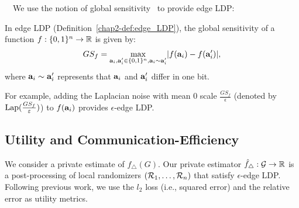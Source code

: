 \smallskip
{}~~We use the notion of global sensitivity~\cite{DP} to provide edge LDP: 
\begin{definition}
In edge LDP (Definition~\ref{chap2-def:edge_LDP}), the global sensitivity of a function $f: \{0,1\}^n \rightarrow \mathbb{R}$ is given by:
\begin{align*}
    GS_f = \underset{\mathbf{a}_i, \mathbf{a}'_i \in \{0,1\}^n, \mathbf{a}_i \sim \mathbf{a}'_i}{\max} |f(\mathbf{a}_i) - f(\mathbf{a}'_i)|,
\end{align*}
where $\mathbf{a}_i \sim \mathbf{a}'_i$ represents that $\mathbf{a}_i$ and $\mathbf{a}'_i$ differ in one bit.
\end{definition}
For example, adding the Laplacian noise with mean $0$ scale $\frac{GS_f}{\epsilon}$ (denoted by $\textrm{Lap}(\frac{GS_f}{\varepsilon})$) to 
$f(\mathbf{a}_i)$ 
provides $\epsilon$-edge LDP. 

\subsection{Utility and Communication-Efficiency}
\label{chap2-sub:utility_communication_efficiency}
We consider a private estimate of $f_\triangle(G)$. 
Our private estimator $\hat{f}_\triangle : \mathcal{G} \rightarrow \mathbb{R}$ is a post-processing of 
local randomizers $(\mathcal{R}_1, \ldots, \mathcal{R}_n)$ 
that 
satisfy $\epsilon$-edge LDP.
Following previous work, we use the $l_2$ loss (i.e., squared error)
\cite{Kairouz_ICML16,Wang_USENIX17,Murakami_USENIX19} and the relative error 
\cite{Bindschaedler_SP16,Chen_CCS12,Xiao_SIGMOD11} 
as utility metrics.

